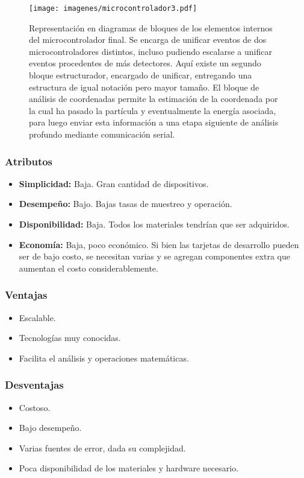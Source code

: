 \begin{figure}[H]
    \centering
    \texttt{[image: imagenes/microcontrolador3.pdf]}
    \caption{Representación en diagramas de bloques de los elementos internos del microcontrolador final. Se encarga de unificar eventos de dos microcontroladores distintos, incluso pudiendo escalarse a unificar eventos procedentes de más detectores. Aquí existe un segundo bloque estructurador, encargado de unificar, entregando una estructura de igual notación pero mayor tamaño. El bloque de análisis de coordenadas permite la estimación de la coordenada por la cual ha pasado la partícula y eventualmente la energía asociada, para luego enviar esta información a una etapa siguiente de análisis profundo mediante comunicación serial.}
    \label{fig:microcontrolador3}
\end{figure}


\newpage
\subsubsection*{Atributos}
\begin{itemize}
    \item \textbf{Simplicidad: } Baja. Gran cantidad de dispositivos.
    \item \textbf{Desempeño: } Bajo. Bajas tasas de muestreo y operación.
    \item \textbf{Disponibilidad: } Baja. Todos los materiales tendrían que ser adquiridos.
    \item \textbf{Economía: } Baja, poco económico. Si bien las tarjetas de desarrollo pueden ser de bajo costo, se necesitan varias y se agregan componentes extra que aumentan el costo considerablemente.
\end{itemize}

\subsubsection*{Ventajas}
\begin{itemize}
    \item Escalable.
    \item Tecnologías muy conocidas.
    \item Facilita el análisis y operaciones matemáticas.
\end{itemize}


\subsubsection*{Desventajas}
\begin{itemize}
    \item Costoso.
    \item Bajo desempeño.
    \item Varias fuentes de error, dada su complejidad.
    \item Poca disponibilidad de los materiales y hardware necesario.
\end{itemize}


